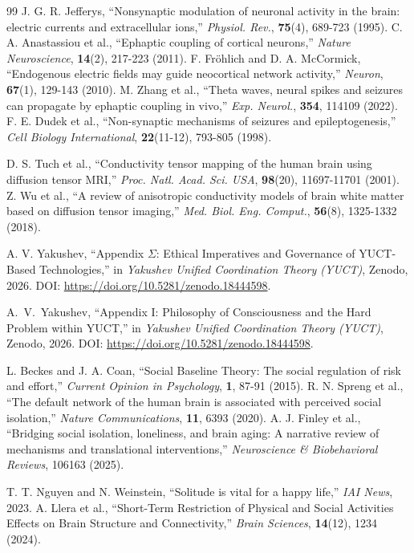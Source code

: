 \documentclass[12pt,a4paper]{article}
\begin{document}
\begin{thebibliography}{99}
			 J. G. R. Jefferys, ``Nonsynaptic modulation of neuronal activity in the brain: electric currents and extracellular ions,'' \emph{Physiol. Rev.}, \textbf{75}(4), 689-723 (1995).
			 C. A. Anastassiou et al., ``Ephaptic coupling of cortical neurons,'' \emph{Nature Neuroscience}, \textbf{14}(2), 217-223 (2011).
			 F. Fröhlich and D. A. McCormick, ``Endogenous electric fields may guide neocortical network activity,'' \emph{Neuron}, \textbf{67}(1), 129-143 (2010).
			 M. Zhang et al., ``Theta waves, neural spikes and seizures can propagate by ephaptic coupling in vivo,'' \emph{Exp. Neurol.}, \textbf{354}, 114109 (2022).
			 F. E. Dudek et al., ``Non-synaptic mechanisms of seizures and epileptogenesis,'' \emph{Cell Biology International}, \textbf{22}(11-12), 793-805 (1998).
			
			 D. S. Tuch et al., ``Conductivity tensor mapping of the human brain using diffusion tensor MRI,'' \emph{Proc. Natl. Acad. Sci. USA}, \textbf{98}(20), 11697-11701 (2001).
			 Z. Wu et al., ``A review of anisotropic conductivity models of brain white matter based on diffusion tensor imaging,'' \emph{Med. Biol. Eng. Comput.}, \textbf{56}(8), 1325-1332 (2018).
			
			 A. V. Yakushev, ``Appendix \(\Sigma\): Ethical Imperatives and Governance of YUCT-Based Technologies,'' in \emph{Yakushev Unified Coordination Theory (YUCT)}, Zenodo, 2026. DOI: \url{https://doi.org/10.5281/zenodo.18444598}.
			
			 A.~V.~Yakushev, ``Appendix I: Philosophy of Consciousness and the Hard Problem within YUCT,'' in \emph{Yakushev Unified Coordination Theory (YUCT)}, Zenodo, 2026. DOI: \url{https://doi.org/10.5281/zenodo.18444598}.
			
			 L. Beckes and J. A. Coan, ``Social Baseline Theory: The social regulation of risk and effort,'' \emph{Current Opinion in Psychology}, \textbf{1}, 87-91 (2015).
			 R. N. Spreng et al., ``The default network of the human brain is associated with perceived social isolation,'' \emph{Nature Communications}, \textbf{11}, 6393 (2020).
			 A. J. Finley et al., ``Bridging social isolation, loneliness, and brain aging: A narrative review of mechanisms and translational interventions,'' \emph{Neuroscience \& Biobehavioral Reviews}, 106163 (2025).
			
			 T. T. Nguyen and N. Weinstein, ``Solitude is vital for a happy life,'' \emph{IAI News}, 2023.
			 A. Llera et al., ``Short-Term Restriction of Physical and Social Activities Effects on Brain Structure and Connectivity,'' \emph{Brain Sciences}, \textbf{14}(12), 1234 (2024).
			
		
		
	\end{thebibliography}
	
\end{document}
